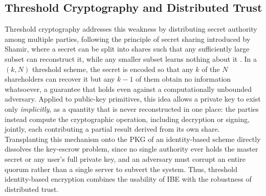 \subsection{Threshold Cryptography and Distributed Trust}
\label{subsec:threshold}

Threshold cryptography addresses this weakness by distributing secret authority among multiple parties, following the principle of secret sharing introduced by Shamir, where a secret can be split into shares such that any sufficiently large subset can reconstruct it, while any smaller subset learns nothing about it \cite{M:Nakamoto08}. In a $(k, N)$ threshold scheme, the secret is encoded so that any $k$ of the $N$ shareholders can recover it but any $k-1$ of them obtain no information whatsoever, a guarantee that holds even against a computationally unbounded adversary. Applied to public-key primitives, this idea allows a private key to exist only \emph{implicitly}, as a quantity that is never reconstructed in one place: the parties instead compute the cryptographic operation, including decryption or signing, jointly, each contributing a partial result derived from its own share. Transplanting this mechanism onto the PKG of an identity-based scheme directly dissolves the key-escrow problem, since no single authority ever holds the master secret or any user’s full private key, and an adversary must corrupt an entire quorum rather than a single server to subvert the system. Thus, threshold identity-based encryption combines the usability of IBE with the robustness of distributed trust.

